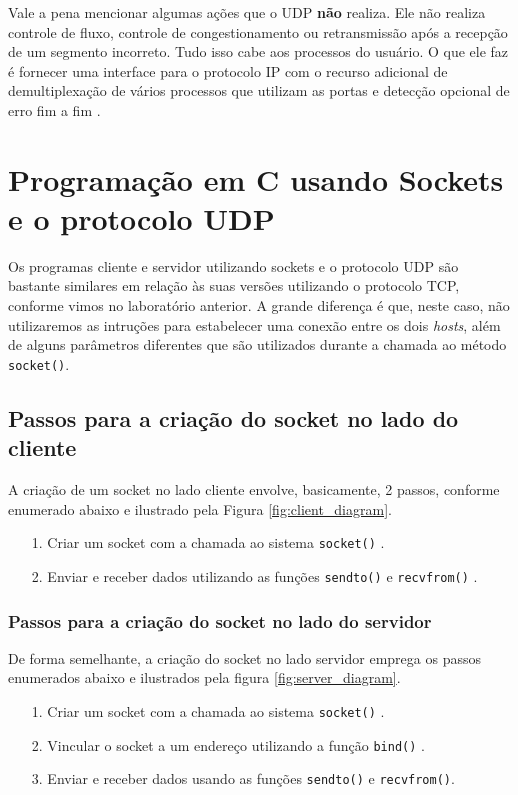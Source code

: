 \documentclass[12pt]{article}
\begin{document}
Vale a pena mencionar algumas ações que o UDP \textbf{não} realiza. Ele não realiza
controle de fluxo, controle de congestionamento ou retransmissão após a recepção de
um segmento incorreto. Tudo isso cabe aos processos do usuário. O que ele faz é
fornecer uma interface para o protocolo IP com o recurso adicional de demultiplexação
de vários processos que utilizam as portas e detecção opcional de erro fim a fim
\cite{tanembaum2021}.

\section{Programação em C usando Sockets e o protocolo UDP}

Os programas cliente e servidor utilizando sockets e o protocolo UDP são bastante
similares em relação às suas versões utilizando o protocolo TCP, conforme vimos no
laboratório anterior. A grande diferença é que, neste caso, não utilizaremos as intruções
para estabelecer uma conexão entre os dois \textit{hosts}, além de alguns parâmetros
diferentes que são utilizados durante a chamada ao método \texttt{socket()}.

\subsection{Passos para a criação do socket no lado do cliente}

A criação de um socket no lado cliente envolve, basicamente, 2 passos, conforme enumerado
abaixo e ilustrado pela Figura \ref{fig:client_diagram}.

\begin{itemize}
  \item[1.] Criar um socket com a chamada ao sistema \texttt{socket()} \cite{man_socket}.
  \item[2.] Enviar e receber dados utilizando as funções \texttt{sendto()} \cite{man_send}
    e \texttt{recvfrom()} \cite{man_recv}.
\end{itemize}

\subsubsection{Passos para a criação do socket no lado do servidor}

De forma semelhante, a criação do socket no lado servidor emprega os passos enumerados
abaixo e ilustrados pela figura \ref{fig:server_diagram}.

\begin{itemize}
  \item[1.] Criar um socket com a chamada ao sistema \texttt{socket()} \cite{man_socket}.
  \item[2.] Vincular o socket a um endereço utilizando a função \texttt{bind()}
    \cite{man_bind}.
  \item[3.] Enviar e receber dados usando as funções \texttt{sendto()} e
    \texttt{recvfrom()}.
\end{itemize}
\end{document}
